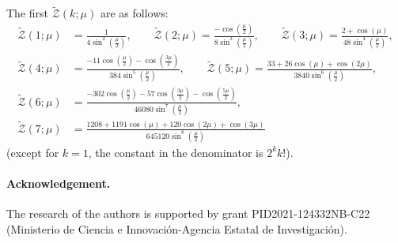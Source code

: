 \documentclass[11pt, oneside]{article}
\newcommand{\calZ}{\mathcal{Z}}
\theoremstyle{plain}
\theoremstyle{definition}
\begin{document}
The first $\widetilde{\calZ}(k;\mu)$ are as follows:
\begin{align*}
\widetilde{\calZ}(1;\mu) &=
\frac{1}{4\sin^2(\frac{\mu}{2})},
\qquad
\widetilde{\calZ}(2;\mu) =
\frac{-\cos(\frac{\mu}{2})}{8\sin^3(\frac{\mu}{2})},
\qquad
\widetilde{\calZ}(3;\mu) =
\frac{2 + \cos(\mu)}{48 \sin^4(\frac{\mu}{2})},
\\
\widetilde{\calZ}(4;\mu) &=
\frac{-11 \cos(\frac{\mu}{2}) - \cos(\frac{3\mu}{2})}{384 \sin^5(\frac{\mu}{2})},
\qquad
\widetilde{\calZ}(5;\mu) =
\frac{33 + 26 \cos(\mu) +  \cos(2\mu)}
  {3840 \sin^6(\frac{\mu}{2})},
\\
\widetilde{\calZ}(6;\mu) &=
\frac{-302 \cos(\frac{\mu}{2}) - 57 \cos(\frac{3\mu}{2}) - \cos(\frac{5\mu}{2})}
{46080 \sin^7(\frac{\mu}{2})},
\\
\widetilde{\calZ}(7;\mu) &=
\frac{1208 + 1191 \cos(\mu) + 120 \cos(2\mu) + \cos(3\mu)}
{645120 \sin^8(\frac{\mu}{2})}
\end{align*}
(except for $k=1$, the constant in the denominator is $2^{k}k!$).

\paragraph*{Acknowledgement.}
The research of the authors is supported by grant PID2021-124332NB-C22
(Mi\-nis\-te\-rio de Cien\-cia e Inno\-va\-ci\'on-Agen\-cia Esta\-tal de Inves\-ti\-ga\-ci\'on).
\end{document}
